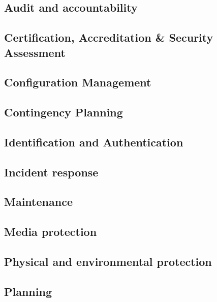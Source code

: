 \documentclass[../main.tex]{subfiles}
\begin{document}
\subsection{Audit and accountability}


\subsection{Certification, Accreditation \& Security Assessment}


\subsection{Configuration Management}


\subsection{Contingency Planning}


\subsection{Identification and Authentication}


\subsection{Incident response}


\subsection{Maintenance}


\subsection{Media protection}


\subsection{Physical and environmental protection}


\subsection{Planning}

\end{document}

